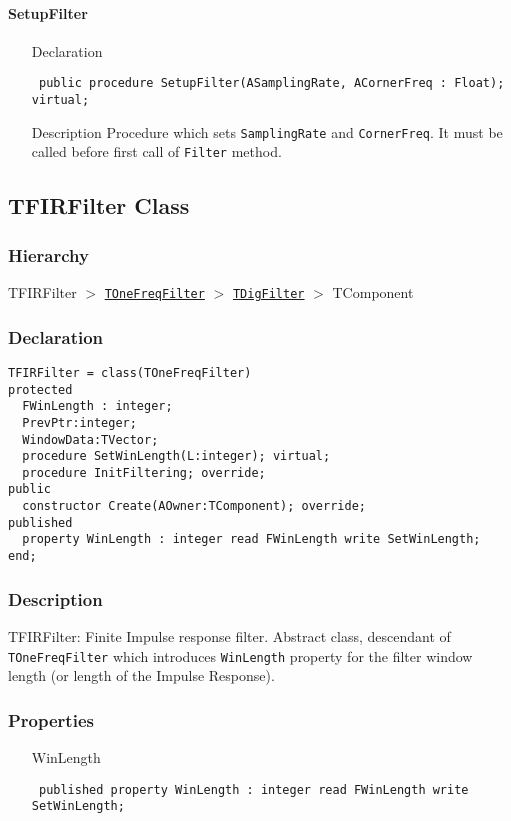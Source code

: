 \documentclass[12pt,a4paper,oneside]{report}
\newcommand{\declarationitem}[1]{{\addfontfeatures{FakeSlant} #1}}
\newcommand{\descriptiontitle}[1]{{\addfontfeatures{FakeSlant}#1}}
\newcommand{\inlineitem}[1]{{\addfontfeatures{FakeBold} #1}}
\newcommand{\code}[1]{\texttt{#1}}
\begin{document}
\paragraph{SetupFilter}
\label{lmfilters.TOneFreqFilter-SetupFilter}
\begin{itemize}\item[\declarationitem{Declaration}\hfill]
	\begin{flushleft}
		\code{
			public procedure SetupFilter(ASamplingRate, ACornerFreq : Float); virtual;}
	\end{flushleft}
	\item[\descriptiontitle{Description}] Procedure which sets \code{SamplingRate} and \code{CornerFreq}. It must be called before first call of \code{Filter} method. 	
\end{itemize}
\subsection{TFIRFilter Class}
\label{lmfilters.TFIRFilter}
\subsubsection{Hierarchy}
TFIRFilter {$>$} \hyperref[lmfilters.TOneFreqFilter]{\code{TOneFreqFilter}} {$>$} \hyperref[lmfilters.TDigFilter]{\code{TDigFilter}} {$>$} 
TComponent
\subsubsection{Declaration}
\begin{verbatim}
TFIRFilter = class(TOneFreqFilter)
protected
  FWinLength : integer;
  PrevPtr:integer;
  WindowData:TVector;
  procedure SetWinLength(L:integer); virtual;
  procedure InitFiltering; override;
public
  constructor Create(AOwner:TComponent); override;
published
  property WinLength : integer read FWinLength write SetWinLength;
end;
\end{verbatim}
\subsubsection{Description}
TFIRFilter: Finite Impulse response filter. Abstract class, descendant of \code{TOneFreqFilter} which introduces \code{WinLength} property for the filter window length (or length of the Impulse Response). 
\subsubsection{Properties}
\begin{itemize}\label{lmfilters.TFIRFilter-WinLength}
	\item[\inlineitem{WinLength}\hfill]
	\begin{flushleft}
		\code{
			published property WinLength : integer read FWinLength write SetWinLength;}
	\end{flushleft}
  \end{itemize}
\end{document}
